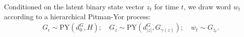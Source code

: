\documentclass{article}
\newcommand{\PY}{\textrm{PY}}
\begin{document}

Conditioned on the latent binary state vector $z_t$ for time $t$, we
draw word $w_t$ according to a hierarchical Pitman-Yor process:
\begin{equation}
\begin{split}
G_{\epsilon} \sim \PY(d^G_{0},H); \quad
G_z \sim \PY(d^G_{|z|},G_{\gamma(z)}); \quad
w_t \sim G_{z_t}.
\end{split}
\end{equation}










\newpage


\begin{small}

 
%
\end{small}
\end{document}
